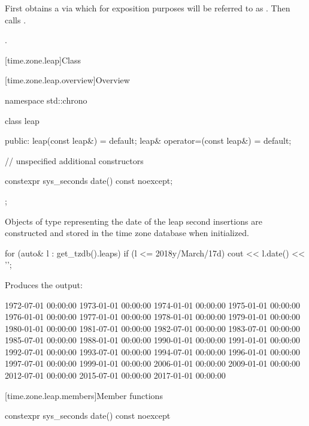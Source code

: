 \begin{itemdescr}
\pnum
\effects
First obtains a  via 
which for exposition purposes will be referred to as .
Then calls .

\pnum
\returns {}.
\end{itemdescr}

[time.zone.leap]{Class }

[time.zone.leap.overview]{Overview}

\begin{codeblock}
namespace std::chrono {
  class leap {
  public:
    leap(const leap&)            = default;
    leap& operator=(const leap&) = default;

    // unspecified additional constructors

    constexpr sys_seconds date() const noexcept;
  };
}
\end{codeblock}

\pnum
Objects of type  representing
the date of the leap second insertions
are constructed and stored in the time zone database when initialized.

\pnum
\begin{example}
\begin{codeblock}
for (auto& l : get_tzdb().leaps)
  if (l <= 2018y/March/17d)
    cout << l.date() << '\n';
\end{codeblock}

Produces the output:

\begin{codeblock}
1972-07-01 00:00:00
1973-01-01 00:00:00
1974-01-01 00:00:00
1975-01-01 00:00:00
1976-01-01 00:00:00
1977-01-01 00:00:00
1978-01-01 00:00:00
1979-01-01 00:00:00
1980-01-01 00:00:00
1981-07-01 00:00:00
1982-07-01 00:00:00
1983-07-01 00:00:00
1985-07-01 00:00:00
1988-01-01 00:00:00
1990-01-01 00:00:00
1991-01-01 00:00:00
1992-07-01 00:00:00
1993-07-01 00:00:00
1994-07-01 00:00:00
1996-01-01 00:00:00
1997-07-01 00:00:00
1999-01-01 00:00:00
2006-01-01 00:00:00
2009-01-01 00:00:00
2012-07-01 00:00:00
2015-07-01 00:00:00
2017-01-01 00:00:00
\end{codeblock}
\end{example}

[time.zone.leap.members]{Member functions}

%
\begin{itemdecl}
constexpr sys_seconds date() const noexcept
\end{itemdecl}


